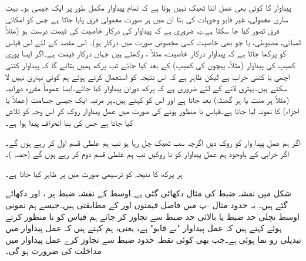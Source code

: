 پیداوار کا کوئی بھی عمل اتنا ٹھیک نہیں ہوتا ہے کہ تمام پیداوار مکمل طور پر ایک جیسی ہو۔  بہت ساری معمولی، غیر قابو وجوہات کی بنا ان میں ہر صورت معمولی فرق پایا جاتا ہے جس کو امکانی فرق تصور کیا جا سکتا ہے۔یہ ضروری ہے کہ پیداوار کی درکار خاصیت کی قیمت درست ہو (مثلاً لمبائی، مضبوطی، یا جو بھی خاصیت کسی مخصوص صورت میں درکار ہو)۔ اس مقصد کے لئے اس قیاس کو پرکھا جاتا ہے کہ پیداوار درکار خاصیت، مثلاً ، رکھتے ہیں جہاں  درکار قیمت ہے۔اگر ایسا پوری کھیپ کی پیداوار (مثلاً،  پیچوں کی کھیپ) کے بعد کیا جائے تب پرکھ ہمیں بتائے گا کہ  پیداوار کتنی اچھی یا کتنی خراب ہے لیکن ظاہر ہے کہ اس نتیجہ کو استعمال کرتے ہوئے ہم کوئی بہتری نہیں لا سکتے ہیں۔بہتری لانے کے لئے ضروری ہے کہ پرکھ دوران پیداوار کیا جائے۔ایسا عموماً مقررہ دورانیہ (مثلاً ہر  منٹ یا ہر گھنٹہ) بعد جاتا ہے اور اس کو  کہتے ہیں۔ہر مرتبہ ایک جیسی جسامت (عملاً  یا  اجزاء) کا نمونہ لیا جاتا ہے۔قیاس نا منظور ہونے کی صورت میں عمل پیداوار روک کر اس وجہ کو تلاش کیا جاتا ہے جس کی بنا انحراف پیدا ہوا ہے۔

اگر ہم عمل پیدا وار کو روک دیں اگرچہ سب ٹھیک چل رہا ہو تب ہم غلطی قسم اول  کر رہے ہوں گے۔اگر خرابی کے باوجود ہم عمل پیداوار کو نا روکیں تب ہم غلطی قسم دوم  کر رہے ہوں گے (حصہ )۔

ہر پرکھ کا نتیجہ کو ترسیمی صورت میں  پر ظاہر کیا جاتا ہے۔

شکل  میں نقشہ ضبط کی مثال دکھائی گئی ہے۔اوسط کے نقشہ ضبط پر  ،   اور   دکھائے گئے ہیں۔ یہ  حدود مثال -پ میں فاصل قیمتوں  اور  کے مطابقتی ہیں۔جیسے ہم نمونی اوسط نچلی حد ضبط یا بالائی حد ضبط سے تجاوز کر جائے ہم قیاس کو نا منظور کرتے ہوئے کہتے ہیں کہ عمل پیداوار "بے قابو" ہے، یعنی، ہم کہتے ہیں کہ عمل پیداوار میں تبدیلی رو نما ہوئی ہے۔جب بھی کوئی نقطہ حدود ضبط سے تجاوز کرے عمل پیداوار میں مداخلت کی ضرورت ہو گی۔

